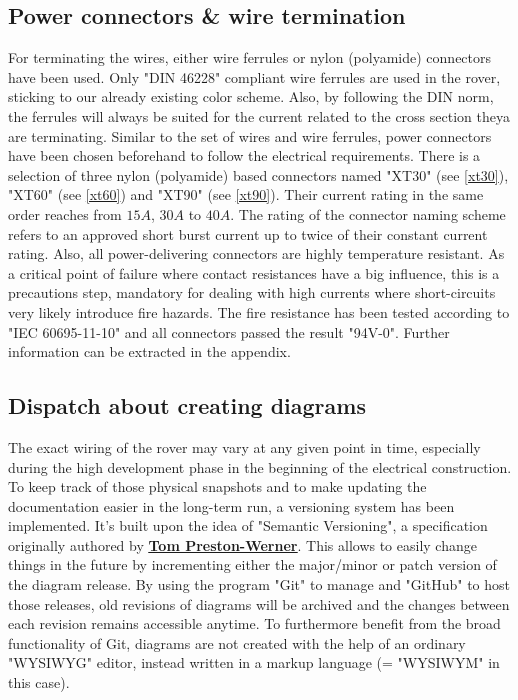 
    \clearpage %

    \subsection{Power connectors \& wire termination}

    
    For terminating the wires, either wire ferrules or nylon (polyamide) connectors have been used. Only "DIN 46228" compliant wire ferrules are used in the rover, sticking to our already existing color scheme. Also, by following the DIN norm, the ferrules will always be suited for the current related to the cross section theya are terminating. Similar to the set of wires and wire ferrules, power connectors have been chosen beforehand to follow the electrical requirements. There is a selection of three nylon (polyamide) based connectors named "XT30" (see \ref{xt30}), "XT60" (see \ref{xt60}) and "XT90" (see \ref{xt90}). Their current rating in the same order reaches from $15A$, $30A$ to $40A$. The rating of the connector naming scheme refers to an approved short burst current up to twice of their constant current rating. Also, all power-delivering connectors are highly temperature resistant. As a critical point of failure where contact resistances have a big influence, this is a precautions step, mandatory for dealing with high currents where short-circuits very likely introduce fire hazards. The fire resistance has been tested according to "IEC 60695-11-10" and all connectors passed the result "94V-0". Further information can be extracted in the appendix.

    \subsection{Dispatch about creating diagrams}

    The exact wiring of the rover may vary at any given point in time, especially during the high development phase in the beginning of the electrical construction. To keep track of those physical snapshots and to make updating the documentation easier in the long-term run, a versioning system has been implemented. It's built upon the idea of "Semantic Versioning", a specification originally authored by \href{https://tom.preston-werner.com/}{\textbf{\underline{Tom Preston-Werner}}}. This allows to easily change things in the future by incrementing either the major/minor or patch version of the diagram release. By using the program "Git" to manage and "GitHub" to host those releases, old revisions of diagrams will be archived and the changes between each revision remains accessible anytime. To furthermore benefit from the broad functionality of Git, diagrams are not created with the help of an ordinary "WYSIWYG" editor, instead written in a markup language (= "WYSIWYM" in this case). 

